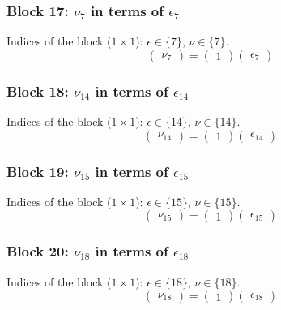 \subsubsection{Block 17: $\nu_{7}$ in terms of $\epsilon_{7}$}
Indices of the block ($1\times 1$): $\epsilon \in \{7\}$, $\nu \in \{7\}$.
\[
\begin{pmatrix}
\nu_{7}
\end{pmatrix}
=
\begin{pmatrix}
1
\end{pmatrix}
\begin{pmatrix}
\epsilon_{7}
\end{pmatrix}
\]

\subsubsection{Block 18: $\nu_{14}$ in terms of $\epsilon_{14}$}
Indices of the block ($1\times 1$): $\epsilon \in \{14\}$, $\nu \in \{14\}$.
\[
\begin{pmatrix}
\nu_{14}
\end{pmatrix}
=
\begin{pmatrix}
1
\end{pmatrix}
\begin{pmatrix}
\epsilon_{14}
\end{pmatrix}
\]

\subsubsection{Block 19: $\nu_{15}$ in terms of $\epsilon_{15}$}
Indices of the block ($1\times 1$): $\epsilon \in \{15\}$, $\nu \in \{15\}$.
\[
\begin{pmatrix}
\nu_{15}
\end{pmatrix}
=
\begin{pmatrix}
1
\end{pmatrix}
\begin{pmatrix}
\epsilon_{15}
\end{pmatrix}
\]

\subsubsection{Block 20: $\nu_{18}$ in terms of $\epsilon_{18}$}
Indices of the block ($1\times 1$): $\epsilon \in \{18\}$, $\nu \in \{18\}$.
\[
\begin{pmatrix}
\nu_{18}
\end{pmatrix}
=
\begin{pmatrix}
1
\end{pmatrix}
\begin{pmatrix}
\epsilon_{18}
\end{pmatrix}
\]

